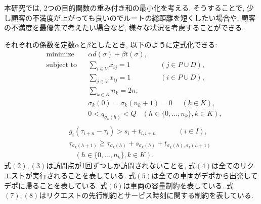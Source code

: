 本研究では, 2つの目的関数の重み付き和の最小化を考える. そうすることで, 少し顧客の不満度が上がっても良いのでルートの総距離を短くしたい場合や, 顧客の不満度を最優先で考えたい場合など, 様々な状況を考慮することができる.

それぞれの係数を定数$\alpha$と$\beta$としたとき, 以下のように定式化できる:
\begin{align*}
  &\textrm{minimize}   &&
  \alpha d(\sigma)+ \beta t(\sigma),\tag{1}\\
  &\textrm{subject to} && \sum_{i \in V} x_{ij} = 1 \ \ \ \ \ \ \ \ \ \ \ \ \ \ \ \ \ \ \ (j \in  P \cup D), \tag{2}\\
  &                    && \sum_{j \in V} x_{ij} = 1 \ \ \ \ \ \ \ \ \ \ \ \ \ \ \ \ \ \ \ (i \in  P \cup D), \tag{3}\\
  &                    && \sum_{k \in K} n_k = 2n,\tag{4}\\
  &                    && \sigma_k(0) = \sigma_k(n_k+1) = 0 \ \ \ \ \ \ (k \in K),\tag{5}\\
  &                    && 0 < q_{\sigma_k(h)} < Q\ \ \ \
  (h \in \{0,...,n_k\},k \in K),\tag{6}\\
\end{align*}
\begin{align*}
  &                    && g_i(\tau_{i+n}-\tau_i) > s_i + t_{i,i+n}\ \ \ \ \ \ \ \ \ \ \ \ \ \  (i \in I),\tag{7}\\
  &                    && \tau_ {\sigma_k (h+1)} \geqq \tau_ {\sigma_k (h)} + s_{\sigma_k (h)} + t_ {\sigma_k (h),\sigma_k (h+1)}\\
  &                    &&  \ \ \ \ (h \in \{0,...,n_k\},k \in K).\tag{8}
\end{align*}
式$(2),(3)$は訪問点が1回ずつしか訪問されないことを, 式$(4)$は全てのリクエストが実行されることを表している. 式$(5)$は全ての車両がデポから出発してデポに帰ることを表している. 式$(6)$は車両の容量制約を表している. 式$(7),(8)$はリクエストの先行制約とサービス時刻に関する制約を表している.
